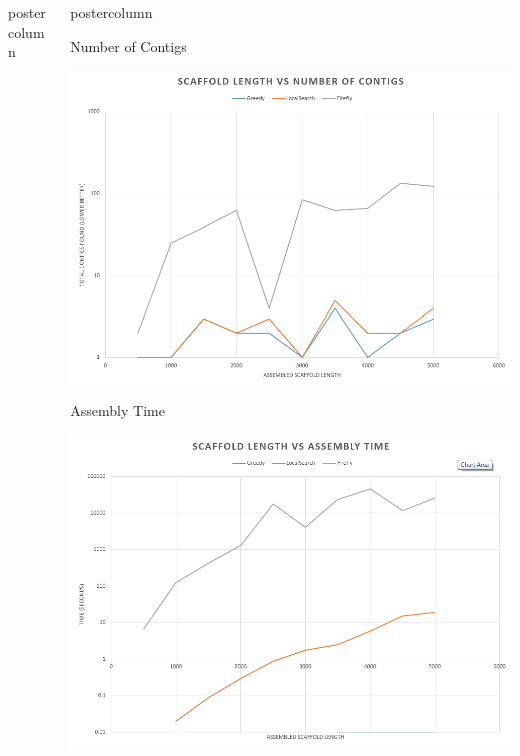 \documentclass[final,hyperref={pdfpagelabels=false}]{beamer}
\newlength{\columnheight}
\begin{document}
\begin{frame}
\begin{columns}
\begin{column}{.32\textwidth}
\begin{beamercolorbox}[center,wd=\textwidth]{postercolumn}
\begin{minipage}[T]{.95\textwidth}
{                    }
        \end{minipage}
    \end{beamercolorbox}
        \end{column}
        \begin{column}{.32\textwidth}
            \begin{beamercolorbox}[center,wd=\textwidth]{postercolumn}
                \begin{minipage}[T]{.95\textwidth}
                    \parbox[t][\columnheight]{\textwidth}{
                        \begin{block}{Number of Contigs}
                            \begin{center}
                                \includegraphics[scale=0.66]{num_contigs}
                            \end{center}
                        \end{block}
                        \begin{block}{Assembly Time}
                            \begin{center}
                                \includegraphics[scale=0.66]{assembly_time}

\end{center}
\end{block}}
\end{minipage}
\end{beamercolorbox}
\end{column}
\end{columns}
\end{frame}
\end{document}
